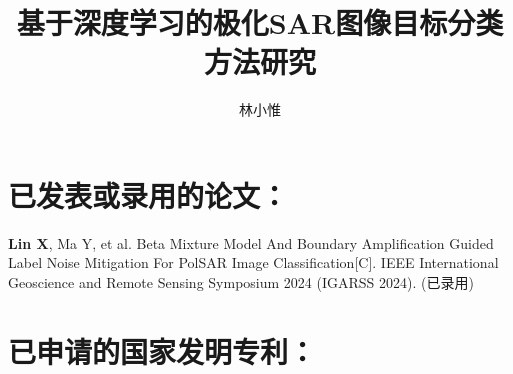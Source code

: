 \documentclass[promaster]{thesis-uestc}
\title{基于深度学习的极化SAR图像目标分类方法研究}{Research on Target Classification Method of Polarimetric SAR Images Based on Deep Learning}
\author{林小惟}{Xiaowei Lin}
\begin{document}
\makecover
\originalitydeclaration %





\thesistableofcontents








% 



%
% 
%


%

% 
% 

\begin{thesistheaccomplish}
    \section*{已发表或录用的论文：}
     \textbf{Lin X}, Ma Y, et al. Beta Mixture Model And Boundary Amplification Guided Label Noise Mitigation For PolSAR Image Classification[C]. IEEE International Geoscience and Remote Sensing Symposium 2024 (IGARSS 2024). (已录用)
    \section*{已申请的国家发明专利：}

\end{thesistheaccomplish}
\end{document}
